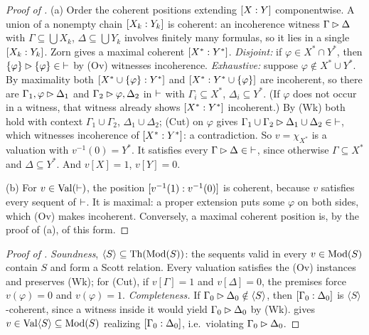 \begin{proof}[Proof of ]
(a) Order the coherent positions extending $[X : Y]$ componentwise. A union of a nonempty chain $[X_k : Y_k]$ is coherent: an incoherence witness $\Gamma\rhd\Delta$ with $\Gamma\subseteq\bigcup X_k$, $\Delta\subseteq\bigcup Y_k$ involves finitely many formulas, so it lies in a single $[X_k : Y_k]$. Zorn gives a maximal coherent $[X^* : Y^*]$.
\emph{Disjoint:} if $\varphi\in X^*\cap Y^*$, then $\{\varphi\}\rhd\{\varphi\}\in{\vdash}$ by (Ov) witnesses incoherence.
\emph{Exhaustive:} suppose $\varphi\notin X^*\cup Y^*$. By maximality both $[X^*\cup\{\varphi\} : Y^*]$ and $[X^* : Y^*\cup\{\varphi\}]$ are incoherent, so there are $\Gamma_1,\varphi\rhd\Delta_1$ and $\Gamma_2\rhd\varphi,\Delta_2$ in ${\vdash}$ with $\Gamma_i\subseteq X^*$, $\Delta_i\subseteq Y^*$. (If $\varphi$ does not occur in a witness, that witness already shows $[X^* : Y^*]$ incoherent.) By (Wk) both hold with context $\Gamma_1\cup\Gamma_2$, $\Delta_1\cup\Delta_2$; (Cut) on $\varphi$ gives $\Gamma_1\cup\Gamma_2\rhd\Delta_1\cup\Delta_2\in{\vdash}$, which witnesses incoherence of $[X^* : Y^*]$: a contradiction.
So $v=\chi_{X^*}$ is a valuation with $v^{-1}(0)=Y^*$. It satisfies every $\Gamma\rhd\Delta\in{\vdash}$, since otherwise $\Gamma\subseteq X^*$ and $\Delta\subseteq Y^*$. And $v[X]=1$, $v[Y]=0$.

(b) For $v\in\mathrm{Val}(\vdash)$, the position $[v^{-1}(1) : v^{-1}(0)]$ is coherent, because $v$ satisfies every sequent of ${\vdash}$. It is maximal: a proper extension puts some $\varphi$ on both sides, which (Ov) makes incoherent. Conversely, a maximal coherent position is, by the proof of (a), of this form.
\end{proof}

\begin{proof}[Proof of ]
\emph{Soundness}, $\langle S\rangle\subseteq\mathrm{Th}(\mathrm{Mod}(S))$: the sequents valid in every $v\in\mathrm{Mod}(S)$ contain $S$ and form a Scott relation. Every valuation satisfies the (Ov) instances and preserves (Wk); for (Cut), if $v[\Gamma]=1$ and $v[\Delta]=0$, the premises force $v(\varphi)=0$ and $v(\varphi)=1$.
\emph{Completeness.} If $\Gamma_0\rhd\Delta_0\notin\langle S\rangle$, then $[\Gamma_0 : \Delta_0]$ is $\langle S\rangle$-coherent, since a witness inside it would yield $\Gamma_0\rhd\Delta_0$ by (Wk).  gives $v\in\mathrm{Val}\langle S\rangle\subseteq\mathrm{Mod}(S)$ realizing $[\Gamma_0 : \Delta_0]$, i.e.\ violating $\Gamma_0\rhd\Delta_0$.
\end{proof}


